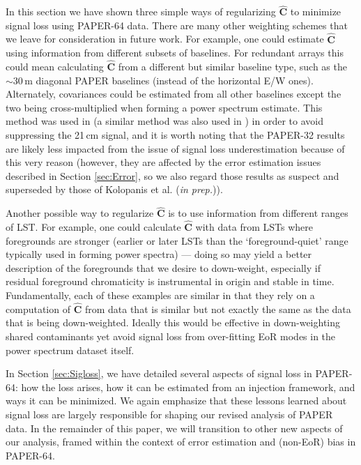 \documentclass[preprint2,numberedappendix,tighten]{aastex6}  %
\begin{document}
In this section we have shown three simple ways of regularizing $\widehat{\textbf{C}}$ to minimize signal loss using PAPER-64 
data. There are many other weighting schemes that we leave for consideration in future work. For example, one could estimate 
$\widehat{\textbf{C}}$ using information from different subsets of baselines. For redundant arrays this could mean calculating $
\widehat{\textbf{C}}$ from a different but similar baseline type, such as the $\sim30$\,m diagonal PAPER baselines (instead of the 
horizontal E/W ones). Alternately, covariances could be estimated from all other baselines except the two being cross-multiplied 
when forming a power spectrum estimate. This method was used in \citet{parsons_et_al2014} (a similar method was also used in \citet{dillon_et_al2015}) in order to avoid suppressing the 
21\,cm signal, and it is worth noting that the PAPER-32 results are likely less impacted from the issue of signal loss underestimation 
because of this very reason (however, they are affected by the error estimation issues described in Section \ref{sec:Error}, so 
we also regard those results as suspect and superseded by those of Kolopanis et al. (\textit{in prep.})).

Another possible way to regularize $\widehat{\textbf{C}}$ is to use information from different ranges of LST. For example, one could 
calculate $\widehat{\textbf{C}}$ with data from LSTs where foregrounds are stronger (earlier or later LSTs than the `foreground-quiet' range typically used in forming power spectra) --- doing so may yield a better description of the foregrounds that we desire to 
down-weight, especially if residual foreground chromaticity is instrumental in origin and stable in time. Fundamentally, each of these examples are similar in that they rely on a computation of $\widehat{\textbf{C}}$ from 
data that is similar but not exactly the same as the data that is being down-weighted. Ideally this would be effective in down-weighting shared contaminants yet avoid signal loss from over-fitting EoR modes in the power spectrum dataset itself. 

In Section \ref{sec:Sigloss}, we have detailed several aspects of signal loss in PAPER-64: how the loss arises, how it can be estimated from an injection framework, and ways it can be minimized. We again emphasize that these lessons learned about signal loss are largely responsible for shaping our revised analysis of PAPER data. In the remainder of this paper, we will transition to other new aspects of our analysis, framed within the context of error estimation and (non-EoR) bias in PAPER-64.
\end{document}
